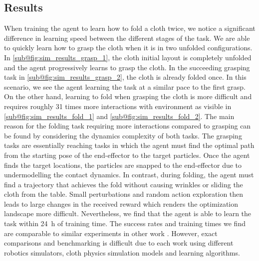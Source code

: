 \documentclass[\home/main.tex]{subfiles}
\begin{document}
\subsection{Results}
When training the agent to learn how to fold a cloth twice, we notice a significant difference in learning speed between the different stages of the task. We are able to quickly learn how to grasp the cloth when it is in two unfolded configurations. In \cref{sub@fig:sim_results_grasp_1}, the cloth initial layout is completely unfolded and the agent progressively learns to grasp the cloth. In the succeeding grasping task in \cref{sub@fig:sim_results_grasp_2}, the cloth is already folded once. In this scenario, we see the agent learning the task at a similar pace to the first grasp. On the other hand, learning to fold when grasping the cloth is more difficult and requires roughly 31 times more interactions with environment as visible in \cref{sub@fig:sim_results_fold_1} and \cref{sub@fig:sim_results_fold_2}. The main reason for the folding task requiring more interactions compared to grasping can be found by considering the dynamics complexity of both tasks. The grasping tasks are essentially reaching tasks in which the agent must find the optimal path from the starting pose of the end-effector to the target particles. Once the agent finds the target locations, the particles are snapped to the end-effector due to undermodelling the contact dynamics. In contrast, during folding, the agent must find a trajectory that achieves the fold without causing wrinkles or sliding the cloth from the table. Small perturbations and random action exploration then leads to large changes in the received reward which renders the optimization landscape more difficult. Nevertheless, we find that the agent is able to learn the task within \qty{24}{\hour} of training time.
The success rates and training times we find are comparable to similar experiments in other work \autocite{Matas2018,jangir2020dynamic}. However, exact comparisons and benchmarking is difficult due to each work using different robotics simulators, cloth physics simulation models and learning algorithms.
\end{document}
